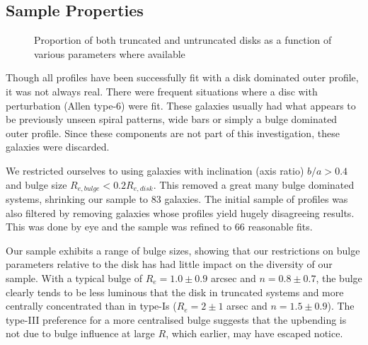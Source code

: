 \subsection{Sample Properties}
\begin{figure}
	\caption{\footnotesize{Proportion of both truncated and untruncated disks as a function of various parameters where available}}
	\label{fig: prop_hist}
\end{figure}
Though all profiles have been successfully fit with a disk dominated outer profile, it was not always real. There were frequent situations where a disc with perturbation (Allen type-6) were fit. These galaxies usually had what appears to be previously unseen spiral patterns, wide bars or simply a bulge dominated outer profile. Since these components are not part of this investigation, these galaxies were discarded.

We restricted ourselves to using galaxies with inclination (axis ratio) $b/a > 0.4$ and bulge size $R_{e,bulge} < 0.2R_{e,disk}$. This removed a great many bulge dominated systems, shrinking our sample to 83 galaxies. The initial sample of profiles was also filtered by removing galaxies whose profiles yield hugely disagreeing results. This was done by eye and the sample was refined to 66 reasonable fits. 

Our sample exhibits a range of bulge sizes, showing that our restrictions on bulge parameters relative to the disk has had little impact on the diversity of our sample. With a typical bulge of $R_e = 1.0\pm 0.9$ arcsec and $n = 0.8\pm 0.7$, the bulge clearly tends to be less luminous that the disk in truncated systems and more centrally concentrated than in type-Is ($R_e = 2\pm 1$ arsec and $n = 1.5 \pm 0.9$). The type-III preference for a more centralised bulge suggests that the upbending is not due to bulge influence at large $R$, which earlier, may have escaped notice. 

